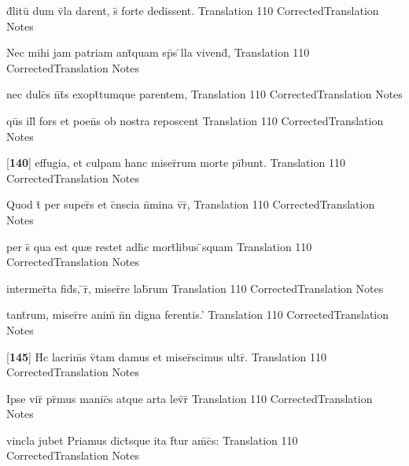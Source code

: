 \latline
  {d\={}litu\={\macron {\i}} dum v\={}la darent, s\={\macron {\i}} forte dedissent.}
  { Translation }
  {110}
  { CorrectedTranslation }
  { Notes }


\latline
  {Nec mihi jam patriam ant\={\macron {\i}}quam sp\={}s \={}lla vivend\={\macron {\i}},}
  { Translation }
  {110}
  { CorrectedTranslation }
  { Notes }


\latline
  {nec dulc\={\macron {\i}}s n\={}t\={}s exopt\={}tumque parentem,}
  { Translation }
  {110}
  { CorrectedTranslation }
  { Notes }


\latline
  {qu\={}s ill\={\macron {\i}} fors et poen\={}s ob nostra reposcent}
  { Translation }
  {110}
  { CorrectedTranslation }
  { Notes }


\latline
  {[\textbf{140}] effugia, et culpam hanc miser\={}rum morte pi\={}bunt.}
  { Translation }
  {110}
  { CorrectedTranslation }
  { Notes }


\latline
  {Quod t\={} per super\={}s et c\={}nscia n\={}mina v\={}r\={\macron {\i}},}
  { Translation }
  {110}
  { CorrectedTranslation }
  { Notes }


\latline
  {per s\={\macron {\i}} qua est qu{\ae} restet adh\={}c mort\={}libus \={}squam}
  { Translation }
  {110}
  { CorrectedTranslation }
  { Notes }


\latline
  {intermer\={}ta fid\={}s, \={}r\={}, miser\={}re lab\={}rum}
  { Translation }
  {110}
  { CorrectedTranslation }
  { Notes }


\latline
  {tant\={}rum, miser\={}re anim\={\macron {\i}} n\={}n digna ferentis.'}
  { Translation }
  {110}
  { CorrectedTranslation }
  { Notes }


\latline
  {[\textbf{145}] H\={\macron {\i}}c lacrim\={\macron {\i}}s v\={\macron {\i}}tam damus et miser\={}scimus ultr\={}.}
  { Translation }
  {110}
  { CorrectedTranslation }
  { Notes }


\latline
  {Ipse vir\={} pr\={\macron {\i}}mus manic\={}s atque arta lev\={}r\={\macron {\i}}}
  { Translation }
  {110}
  { CorrectedTranslation }
  { Notes }


\latline
  {vincla jubet Priamus dict\={\macron {\i}}sque ita f\={}tur am\={\macron {\i}}c\={\macron {\i}}s:}
  { Translation }
  {110}
  { CorrectedTranslation }
  { Notes }


